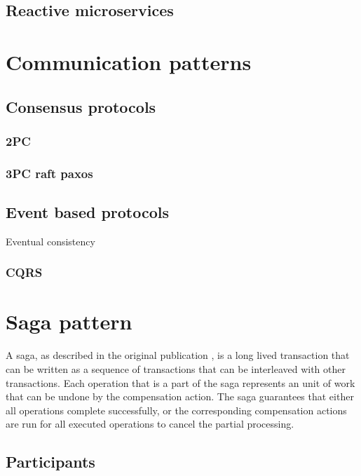 \documentclass[oneside,
  digital, %
  table,   %
  nolof,     %
  nolot,     %
]{fithesis3}
\begin{document}
\section{Reactive microservices}


\clearpage
\chapter{Communication patterns}

\section{Consensus protocols}

\subsection{2PC}

\subsection{3PC raft paxos}

\section{Event based protocols}

Eventual consistency

\subsection{CQRS}

\clearpage
\chapter{Saga pattern}

A saga, as described in the original publication \cite{sagas_publ}, is a long lived transaction that can be written as a sequence of transactions that can be interleaved with other transactions. Each operation that is a part of the saga represents an unit of work that can be undone by the compensation action. The saga guarantees that either all operations complete successfully, or the corresponding compensation actions are run for all executed operations to cancel the partial processing.

\section{Participants}
\end{document}
